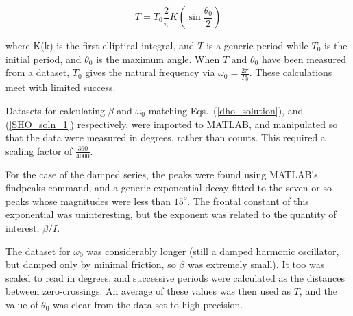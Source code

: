 \documentclass[12pt,twoside]{reedthesis}
\begin{document}
\begin{equation}
\label{elliptical_integral}
T = T_0 \frac{2}{\pi}K(\sin\frac{\theta_0}{2})
\end{equation}

where K(k) is the first elliptical integral, and $T$ is a generic period while $T_0$ is the initial period, and $\theta_0$ is the maximum angle.  When $T$ and $\theta_0$ have been measured from a dataset, $T_0$ gives the natural frequency via $\omega_0 = \frac{2 \pi}{P_0}$.  These calculations meet with limited success.  

Datasets for calculating $\beta$ and $\omega_0$ matching Eqs.\ (\ref{dho_solution}), and (\ref{SHO_soln_1}) respectively, were imported to MATLAB, and manipulated so that the data were measured in degrees, rather than counts.  This required a scaling factor of $\frac{360}{4000}$.  

For the case of the damped series, the peaks were found using MATLAB's findpeaks command, and a generic exponential decay fitted to the seven or so peaks whose magnitudes were less than $15^o$.  The frontal constant of this exponential was uninteresting, but the exponent was related to the quantity of interest, $\beta/I$.    

The dataset for $\omega_0$ was considerably longer (still a damped harmonic oscillator, but damped only by minimal friction, so $\beta$ was extremely small).  It too was scaled to read in degrees, and successive periods were calculated as the distances between zero-crossings.  An average of these values was then used as $T$, and the value of $\theta_0$ was clear from the data-set to high precision.  
\end{document}
